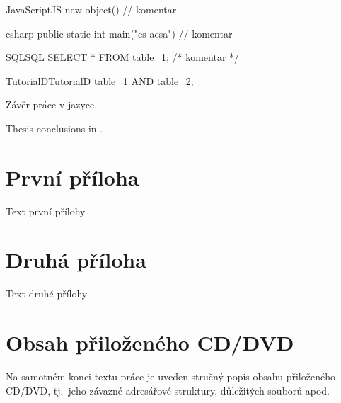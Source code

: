 \documentclass[
  field=inf,
  biblatex,
  glossaries,
  index
]{kidiplom}
\begin{document}
\begin{kicode}{JavaScript}{}{JS}
new object() // komentar
\end{kicode}

\begin{kicode}{csharp}{}{\csharp}
public static int main("cs acsa") // komentar
\end{kicode}

\begin{kicode}{SQL}{}{SQL}
SELECT * FROM table_1; /* komentar */
\end{kicode}

\begin{kicode}{TutorialD}{}{TutorialD}
table_1 AND table_2;
\end{kicode}

\begin{kiconclusions}
Závěr práce v  jazyce.
\end{kiconclusions}

\begin{kiconclusions}[english]
Thesis conclusions in .
\end{kiconclusions}

\appendix

\section{První příloha}
Text první přílohy

\section{Druhá příloha}
Text druhé přílohy

\section{Obsah přiloženého CD/DVD} \label{sec:ObsahCD}

Na samotném konci textu práce je uveden stručný popis obsahu
přiloženého CD/DVD, tj.~jeho závazné adresářové struktury, důležitých
souborů apod.
\end{document}
